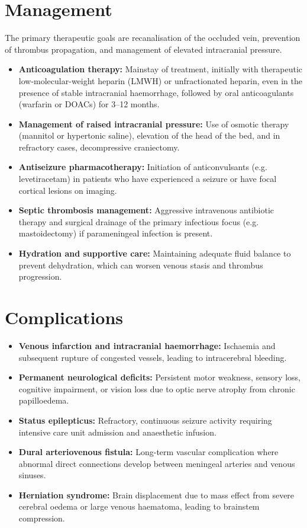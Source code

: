 \section*{Management}
The primary therapeutic goals are recanalisation of the occluded vein, prevention of thrombus propagation, and management of elevated intracranial pressure.
\begin{itemize}
    \item \textbf{Anticoagulation therapy:} Mainstay of treatment, initially with therapeutic low-molecular-weight heparin (LMWH) or unfractionated heparin, even in the presence of stable intracranial haemorrhage, followed by oral anticoagulants (warfarin or DOACs) for 3--12 months.
    \item \textbf{Management of raised intracranial pressure:} Use of osmotic therapy (mannitol or hypertonic saline), elevation of the head of the bed, and in refractory cases, decompressive craniectomy.
    \item \textbf{Antiseizure pharmacotherapy:} Initiation of anticonvulsants (e.g. levetiracetam) in patients who have experienced a seizure or have focal cortical lesions on imaging.
    \item \textbf{Septic thrombosis management:} Aggressive intravenous antibiotic therapy and surgical drainage of the primary infectious focus (e.g. mastoidectomy) if parameningeal infection is present.
    \item \textbf{Hydration and supportive care:} Maintaining adequate fluid balance to prevent dehydration, which can worsen venous stasis and thrombus progression.
\end{itemize}

\section*{Complications}
\begin{itemize}
    \item \textbf{Venous infarction and intracranial haemorrhage:} Ischaemia and subsequent rupture of congested vessels, leading to intracerebral bleeding.
    \item \textbf{Permanent neurological deficits:} Persistent motor weakness, sensory loss, cognitive impairment, or vision loss due to optic nerve atrophy from chronic papilloedema.
    \item \textbf{Status epilepticus:} Refractory, continuous seizure activity requiring intensive care unit admission and anaesthetic infusion.
    \item \textbf{Dural arteriovenous fistula:} Long-term vascular complication where abnormal direct connections develop between meningeal arteries and venous sinuses.
    \item \textbf{Herniation syndrome:} Brain displacement due to mass effect from severe cerebral oedema or large venous haematoma, leading to brainstem compression.
\end{itemize}

